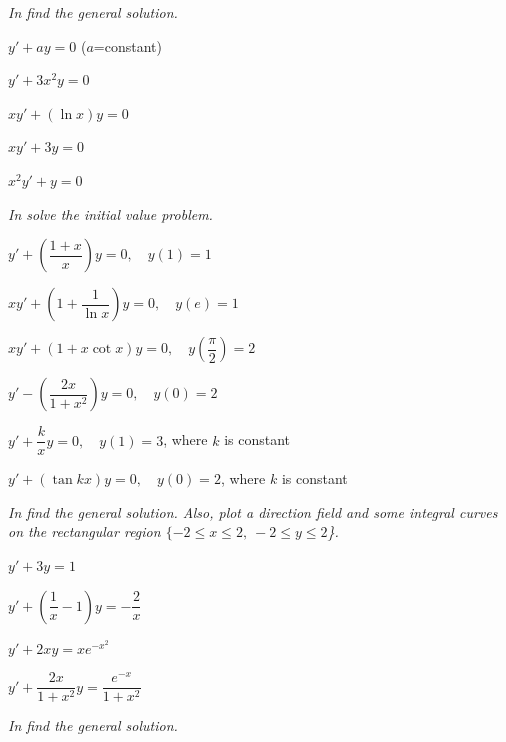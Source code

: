 \exercises

\emph{In  find the general solution.}

\begin{exerciselistTwoColumn}
\item\label{exer:2.1.1}$y'+ay=0$ ($a$=constant)
\item\label{exer:2.1.2}$y'+3x^2y=0$
\item\label{exer:2.1.3}$xy'+(\ln x)y=0$
\item\label{exer:2.1.4}$xy'+3y=0$
\item\label{exer:2.1.5}$x^2y'+y=0$
\end{exerciselistTwoColumn}
%
\textsl{In  solve
the initial value problem.}

\begin{exerciselist}
\item\label{exer:2.1.6}$y'+\left(\dfrac{1+x}{x}\right)y=0,\quad y(1)=1$

\item\label{exer:2.1.7}$xy'+\left(1+\dfrac{1}{\ln x}\right)y=0,\quad y(e)=1$

\item\label{exer:2.1.8}$xy'+(1+ x\cot x)y=0,\quad y\left(\dfrac{\pi}{2}
\right)=2$

\item\label{exer:2.1.9}$y'-\left(\dfrac{2x}{1+x^2}\right)y=0,\quad y(0)=2$

\item\label{exer:2.1.10}$y'+\dfrac{k}{x}y=0,\quad y(1)=3$, where $k$ is
constant

\item\label{exer:2.1.11}$y'+(\tan kx)y=0,\quad y(0)=2$, where $k$ is
constant
\end{exerciselist}
%
\textsl{In  find
the general solution. Also, plot a direction field and some integral
curves on the rectangular region $\{-2\le x\le2,\ -2\le y\le2$\}.}

\begin{exerciselistTwoColumn}
\item\label{exer:2.1.12}\CGex $y'+3y=1$
\item\label{exer:2.1.13}\CGex $y'+\left(\dfrac{1}{x}-1\right)y=-\dfrac{2}{x}$
\item\label{exer:2.1.14}\CGex $y'+2xy=xe^{-x^2}$
\item\label{exer:2.1.15}\CGex $y'+\dfrac{2x}{1+x^2}y=\dfrac{e^{-x}}{1+x^2}$
\end{exerciselistTwoColumn}
%
\textsl{In  find
the general solution.}

